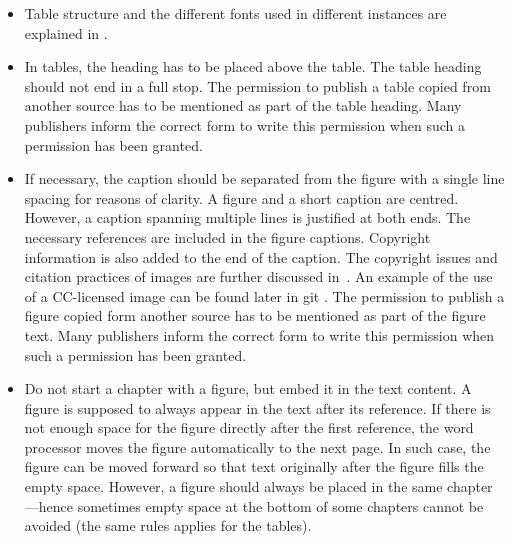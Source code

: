 \begin{itemize}
    \setlength\itemsep{0pt}
    \setlength\parskip{0pt}
    \item Table structure and the different fonts used in different instances are explained in
    .
    \item In tables, the heading has to be placed above the table. The table heading should
    not end in a full stop. The permission to publish a table copied from another
    source has to be mentioned as part of the table heading. Many publishers inform
    the correct form to write this permission when such a permission has been
    granted.
    \item If necessary, the caption should be separated from the figure with a single line spacing for reasons of clarity. A figure and a short caption are centred. However, a caption spanning multiple
    lines is justified at both ends. The necessary references are included in the figure captions. Copyright information is
    also added to the end of the caption. The copyright issues and citation practices of images
    are further discussed in~. An example of the use of a CC-licensed image can
    be found later in git . The permission to
    publish a figure copied form another source has to be mentioned as part of the
    figure text. Many publishers inform the correct form to write this permission
    when such a permission has been granted.
    \item Do not start a chapter with a figure, but embed it in the text content. A figure is
    supposed to always appear in the text after its reference. If there is not enough
    space for the figure directly after the first reference, the word processor moves the
    figure automatically to the next page. In such case, the figure can be moved 
    forward so that text originally after the figure fills the empty space. However, a
    figure should always be placed in the same chapter---hence sometimes empty
    space at the bottom of some chapters cannot be avoided (the same rules applies for the
    tables).
\end{itemize}

